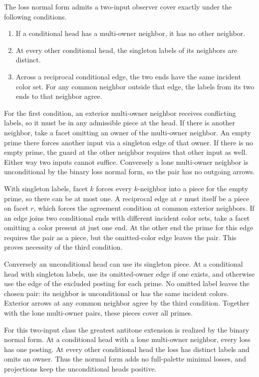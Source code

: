 The loss normal form admits a two-input observer
cover exactly under the following conditions.
\begin{enumerate}
\item If a conditional head has a multi-owner
neighbor, it has no other neighbor.
\item At every other conditional head, the
singleton labels of its neighbors are distinct.
\item Across a reciprocal conditional edge, the
two ends have the same incident color set.
For any common neighbor outside that edge,
the labels from its two ends to that neighbor
agree.
\end{enumerate}

For the first condition, an exterior multi-owner
neighbor receives conflicting labels, so it must
be in any admissible piece at the head. If there
is another neighbor, take a facet omitting an
owner of the multi-owner neighbor. An empty prime
there forces another input via a singleton edge
of that owner. If there is no empty prime, the
guard at the other neighbor requires that other
input as well. Either way two inputs cannot
suffice. Conversely a lone multi-owner neighbor
is unconditional by the binary loss normal form,
so the pair has no outgoing arrows.

With singleton labels, facet $k$ forces every
$k$-neighbor into a piece for the empty prime,
so there can be at most one. A reciprocal edge
at $r$ must itself be a piece on facet $r$,
which forces the agreement condition at common
exterior neighbors. If an edge joins two
conditional ends with different incident color
sets, take a facet omitting a color present
at just one end. At the other end the prime
for this edge requires the pair as a piece,
but the omitted-color edge leaves the pair.
This proves necessity of the third condition.

Conversely an unconditional head can use its
singleton piece. At a conditional head with
singleton labels, use its omitted-owner edge
if one exists, and otherwise use the edge of
the excluded posting for each prime. No
omitted label leaves the chosen pair: its
neighbor is unconditional or has the same
incident colors. Exterior arrows at any
common neighbor agree by the third condition.
Together with the lone multi-owner pairs,
these pieces cover all primes.

For this two-input class the greatest antitone
extension is realized by the binary normal form.
At a conditional head with a lone multi-owner
neighbor, every loss has one posting. At every
other conditional head the loss has distinct
labels and omits an owner. Thus the normal
form adds no full-palette minimal losses,
and projections keep the unconditional
heads positive.

